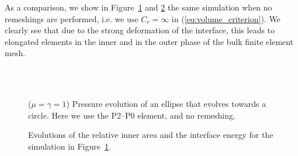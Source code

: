As a comparison, we show in Figure~\ref{fig:ellipse_smooth} and
\ref{fig:ellipse_both_volumes_smooth} the same simulation when no remeshings are
performed, i.e. we use $C_r=\infty$ in (\ref{eq:volume_criterion}). We clearly
see that due to the strong deformation of the interface, this leads to
elongated elements in the inner and in the outer phase of the bulk finite
element mesh.
\begin{figure}[htbp]
\centering
{}\\
\\
\caption[Stokes ellipse pressure no remeshing]
{($\mu=\gamma=1$) Pressure evolution of an ellipse that evolves towards a
circle. Here we use the P2--P0 element, and no remeshing.}
\label{fig:ellipse_smooth}
\end{figure}
\begin{figure}[htbp]
\centering
{}
\caption[Stokes ellipse inner area and interface energy no remeshing]
{Evolutions of the relative inner area and the interface energy for
the simulation in Figure~\ref{fig:ellipse_smooth}.}
\label{fig:ellipse_both_volumes_smooth}
\end{figure}

